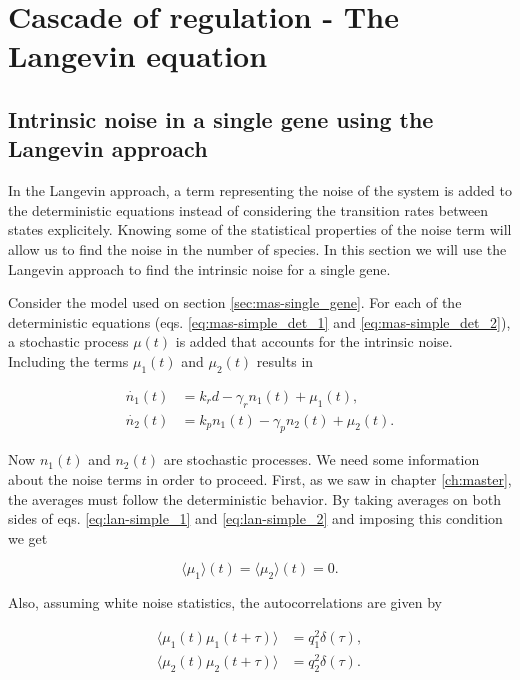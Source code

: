 \chapter{Cascade of regulation - The Langevin equation}

\section{Intrinsic noise in a single gene using the Langevin approach}
\label{sec:lan-single}
In the Langevin approach, a term representing the noise of the system is added to the deterministic equations instead of considering the transition rates between states explicitely. Knowing some of the statistical properties of the noise term will allow us to find the noise in the number of species. In this section we will use the Langevin approach to find the intrinsic noise for a single gene.

Consider the model used on section \ref{sec:mas-single_gene}. For each of the deterministic equations (eqs. \eqref{eq:mas-simple_det_1} and \eqref{eq:mas-simple_det_2}), a stochastic process $\mu(t)$ is added that accounts for the intrinsic noise. Including the terms $\mu_1(t)$ and $\mu_2(t)$ results in

\begin{align}
  \dot{n_1}(t) &= k_rd-\gamma_rn_1(t) + \mu_1(t)\label{eq:lan-simple_1},\\
  \dot{n_2}(t) &= k_pn_1(t)-\gamma_pn_2(t) + \mu_2(t)\label{eq:lan-simple_2}.
\end{align}

Now $n_1(t)$ and $n_2(t)$ are stochastic processes. We need some information about the noise terms in order to proceed. First, as we saw in chapter \ref{ch:master}, the averages must follow the deterministic behavior. By taking averages on both sides of eqs. \eqref{eq:lan-simple_1} and \eqref{eq:lan-simple_2} and imposing this condition we get

\begin{equation*}
  \langle\mu_1\rangle(t) = \langle\mu_2\rangle(t) = 0.
\end{equation*}

Also, assuming white noise statistics, the autocorrelations are given by

\begin{align}
  \langle\mu_1(t)\mu_1(t+\tau)\rangle &= q_1^2\delta(\tau),\label{eq:lan-simple_cor1} \\
  \langle\mu_2(t)\mu_2(t+\tau)\rangle &= q_2^2\delta(\tau). \label{eq:lan-simple_cor2}
\end{align}

